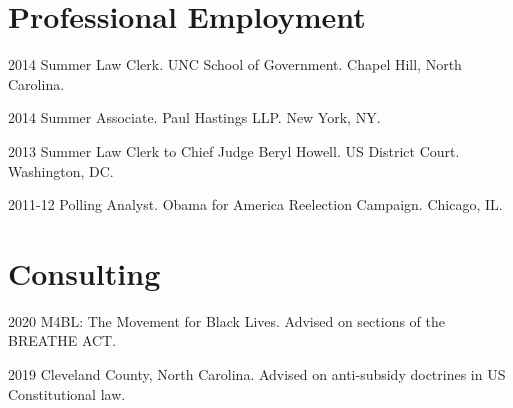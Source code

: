 
    \section*{Professional Employment}

    \begin{tablist}
    \item[2014] \tab{}Summer Law Clerk. UNC School of Government. Chapel Hill, North Carolina.
    \item[2014] \tab{}Summer Associate. Paul Hastings LLP. New York, NY.
    \item[2013] \tab{}Summer Law Clerk to Chief Judge Beryl Howell. US District Court. Washington, DC. 
    \item[2011-12] \tab{}Polling Analyst. Obama for America Reelection Campaign. Chicago, IL.
    \end{tablist}
    
    \section*{Consulting}
    \begin{tablist}
    \item[2020] \tab{}M4BL: The Movement for Black Lives. Advised on sections of the BREATHE ACT.
    \item[2019] \tab{}Cleveland County, North Carolina. Advised on anti-subsidy doctrines in US Constitutional law.
    \end{tablist}
